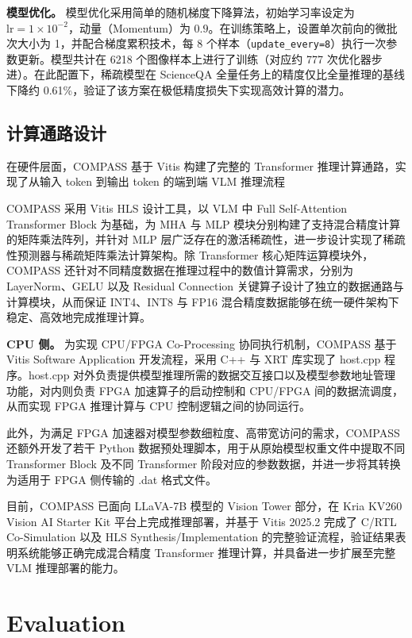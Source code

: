 \documentclass[sigconf]{acmart}
\begin{document}
	\textbf{模型优化。}
	模型优化采用简单的随机梯度下降算法，初始学习率设定为 $\text{lr}=1 \times 10^{-2}$，动量（Momentum）为 $0.9$。在训练策略上，设置单次前向的微批次大小为 1，并配合梯度累积技术，每 8 个样本（\texttt{update\_every=8}）执行一次参数更新。模型共计在 6218 个图像样本上进行了训练（对应约 777 次优化器步进）。在此配置下，稀疏模型在 ScienceQA 全量任务上的精度仅比全量推理的基线下降约 0.61\%，验证了该方案在极低精度损失下实现高效计算的潜力。
	
	\subsection{计算通路设计}

	在硬件层面，COMPASS 基于 Vitis 构建了完整的 Transformer 推理计算通路，实现了从输入 token 到输出 token 的端到端 VLM 推理流程
	
	COMPASS 采用 Vitis HLS 设计工具，以 VLM 中 Full Self-Attention Transformer Block \cite{ViT} \cite{CLIP} 为基础，为 MHA 与 MLP 模块分别构建了支持混合精度计算的矩阵乘法阵列，并针对 MLP 层广泛存在的激活稀疏性，进一步设计实现了稀疏性预测器与稀疏矩阵乘法计算架构。除 Transformer 核心矩阵运算模块外，COMPASS 还针对不同精度数据在推理过程中的数值计算需求，分别为 LayerNorm、GELU 以及 Residual Connection 关键算子设计了独立的数据通路与计算模块，从而保证 INT4、INT8 与 FP16 混合精度数据能够在统一硬件架构下稳定、高效地完成推理计算。
	
	\textbf{CPU 侧。}
	为实现 CPU/FPGA Co-Processing 协同执行机制，COMPASS 基于 Vitis Software Application 开发流程，采用 C++ 与 XRT 库实现了 host.cpp 程序。host.cpp 对外负责提供模型推理所需的数据交互接口以及模型参数地址管理功能，对内则负责 FPGA 加速算子的启动控制和 CPU/FPGA 间的数据流调度，从而实现 FPGA 推理计算与 CPU 控制逻辑之间的协同运行。
	
	此外，为满足 FPGA 加速器对模型参数细粒度、高带宽访问的需求，COMPASS 还额外开发了若干 Python 数据预处理脚本，用于从原始模型权重文件中提取不同 Transformer Block 及不同 Transformer 阶段对应的参数数据，并进一步将其转换为适用于 FPGA 侧传输的 .dat 格式文件。
	
	目前，COMPASS 已面向 LLaVA-7B 模型的 Vision Tower 部分，在 Kria KV260 Vision AI Starter Kit 平台上完成推理部署，并基于 Vitis 2025.2 完成了 C/RTL Co-Simulation 以及 HLS Synthesis/Implementation 的完整验证流程，验证结果表明系统能够正确完成混合精度 Transformer 推理计算，并具备进一步扩展至完整 VLM 推理部署的能力。
	
	\section{Evaluation}
\end{document}
